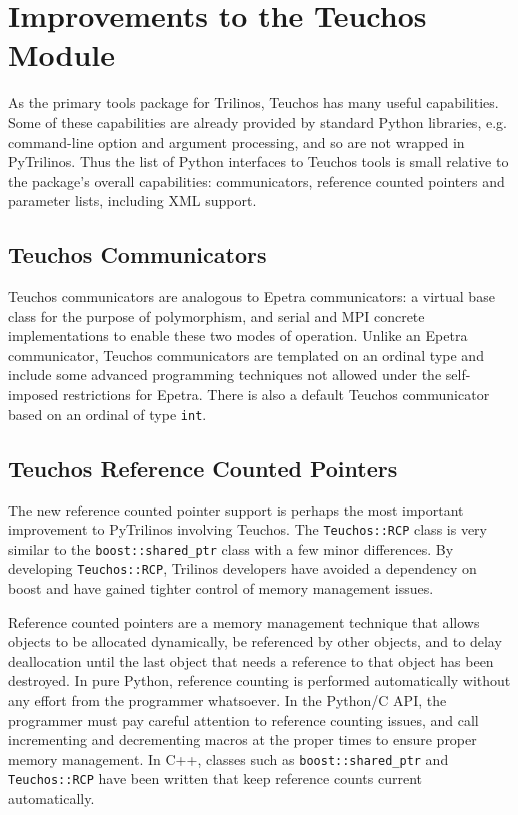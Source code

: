\documentclass[11pt]{article}
\begin{document}
\section{Improvements to the Teuchos Module}
\label{sec:teuchos}

As the primary tools package for Trilinos, Teuchos has many useful capabilities.  Some of these capabilities are already provided by standard Python libraries, e.g. command-line option and argument processing, and so are not wrapped in PyTrilinos.  Thus the list of Python interfaces to Teuchos tools is small relative to the package's overall capabilities: communicators, reference counted pointers and parameter lists, including XML support.

\subsection{Teuchos Communicators}
\label{sec:teuchos_communicators}

Teuchos communicators are analogous to Epetra communicators: a virtual base class for the purpose of polymorphism, and serial and MPI concrete implementations to enable these two modes of operation.  Unlike an Epetra communicator, Teuchos communicators are templated on an ordinal type and include some advanced programming techniques not allowed under the self-imposed restrictions for Epetra.  There is also a default Teuchos communicator based on an ordinal of type {\tt int}.

\subsection{Teuchos Reference Counted Pointers}
\label{sec:teuchos_rcp}

The new reference counted pointer support is perhaps the most important improvement to PyTrilinos involving Teuchos.  The {\tt Teuchos::RCP} class is very similar to the {\tt boost::shared\_ptr} class with a few minor differences.  By developing {\tt Teuchos::RCP}, Trilinos developers have avoided a dependency on boost and have gained tighter control of memory management issues.

Reference counted pointers are a memory management technique that allows objects to be allocated dynamically, be referenced by other objects, and to delay deallocation until the last object that needs a reference to that object has been destroyed.  In pure Python, reference counting is performed automatically without any effort from the programmer whatsoever.  In the Python/C API, the programmer must pay careful attention to reference counting issues, and call incrementing and decrementing macros at the proper times to ensure proper memory management.  In C++, classes such as {\tt boost::shared\_ptr} and {\tt Teuchos::RCP} have been written that keep reference counts current automatically.
\end{document}
